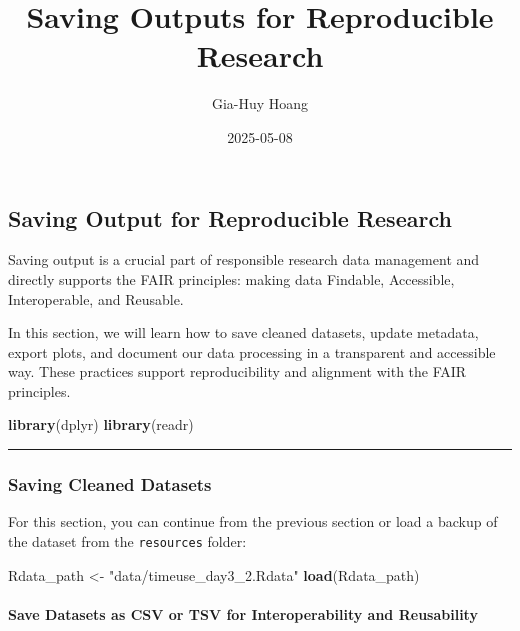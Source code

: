 \documentclass[
]{article}
\title{Saving Outputs for Reproducible Research}
\author{Gia-Huy Hoang}
\date{2025-05-08}
\newenvironment{Shaded}{\begin{snugshade}}{\end{snugshade}}
\newcommand{\FunctionTok}[1]{\textcolor[rgb]{0.13,0.29,0.53}{\textbf{#1}}}
\newcommand{\NormalTok}[1]{#1}
\newcommand{\OtherTok}[1]{\textcolor[rgb]{0.56,0.35,0.01}{#1}}
\newcommand{\StringTok}[1]{\textcolor[rgb]{0.31,0.60,0.02}{#1}}
\begin{document}
\maketitle

{
\setcounter{tocdepth}{2}
\tableofcontents
}
\subsection{Saving Output for Reproducible
Research}\label{saving-output-for-reproducible-research}

Saving output is a crucial part of responsible research data management
and directly supports the FAIR principles: making data Findable,
Accessible, Interoperable, and Reusable.

In this section, we will learn how to save cleaned datasets, update
metadata, export plots, and document our data processing in a
transparent and accessible way. These practices support reproducibility
and alignment with the FAIR principles.

\begin{Shaded}
\begin{Highlighting}[]
\FunctionTok{library}\NormalTok{(dplyr)}
\FunctionTok{library}\NormalTok{(readr)}
\end{Highlighting}
\end{Shaded}

\begin{center}\rule{0.5\linewidth}{0.5pt}\end{center}

\subsubsection{Saving Cleaned Datasets}\label{saving-cleaned-datasets}

For this section, you can continue from the previous section or load a
backup of the dataset from the \texttt{resources} folder:

\begin{Shaded}
\begin{Highlighting}[]
\NormalTok{Rdata\_path }\OtherTok{\textless{}{-}} \StringTok{"data/timeuse\_day3\_2.Rdata"}
\FunctionTok{load}\NormalTok{(Rdata\_path)}
\end{Highlighting}
\end{Shaded}

\paragraph{\texorpdfstring{Save Datasets as CSV or TSV for
\textbf{Interoperability} and
\textbf{Reusability}}{Save Datasets as CSV or TSV for Interoperability and Reusability}}\label{save-datasets-as-csv-or-tsv-for-interoperability-and-reusability}
\end{document}
